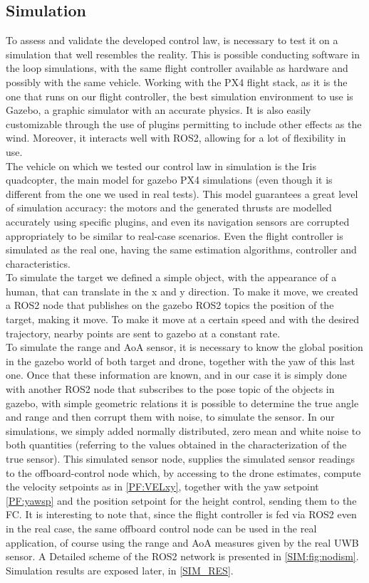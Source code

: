 \subsection{Simulation}
To assess and validate the developed control law, is necessary to test it on a simulation that well resembles the reality.
This is possible conducting software in the loop simulations, with the same flight controller available as hardware and possibly with the same vehicle.
Working with the PX4 flight stack, as it is the one that runs on our flight controller, the best simulation environment to use is Gazebo, a graphic simulator with an accurate physics. It is also easily customizable through the use of plugins permitting to include other effects as the wind. Moreover, it interacts well with ROS2,  allowing for a lot of flexibility in use.\\
The vehicle on which we tested our control law in simulation is the Iris quadcopter, the main model for gazebo PX4 simulations (even though it is different from the one we used in real tests). This model guarantees a great level of simulation accuracy: the motors and the generated thrusts are modelled accurately using specific plugins, and even its navigation sensors are corrupted appropriately to be similar to real-case scenarios. Even the flight controller is simulated as the real one, having the same estimation algorithms, controller and characteristics.\\
To simulate the target we defined a simple object, with the appearance of a human, that can translate in the x and y direction. To make it move, we created a ROS2 node that publishes on the gazebo ROS2 topics the position of the target, making it move. To make it move at a certain speed and with the desired trajectory, nearby points are sent to gazebo at a constant rate.\\
To simulate the range and AoA sensor, it is necessary to know the global position in the gazebo world of both target and drone, together with the yaw of this last one. Once that these information are known, and in our case it is simply done with another ROS2 node that subscribes to the pose topic of the objects in gazebo, with simple geometric relations it is possible to determine the true angle and range and then corrupt them with noise, to simulate the sensor. In our simulations, we simply added normally distributed, zero mean and white noise to both quantities (referring to the values obtained in the characterization of the true sensor). This simulated sensor node, supplies the simulated sensor readings to the offboard-control node which, by accessing to the drone estimates, compute the velocity setpoints as in \eqref{PF:VELxy}, together with the yaw setpoint \eqref{PF:yawsp} and the position setpoint for the height control, sending them to the FC. It is interesting to note that, since the flight controller is fed via ROS2 even in the real case, the same offboard control node can be used in the real application, of course using the range and AoA measures given by the real UWB sensor. A Detailed scheme of the ROS2 network is presented in \autoref{SIM:fig:nodism}. Simulation results are exposed later, in \autoref{SIM_RES}.